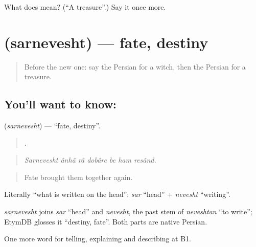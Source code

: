 \begin{tcolorbox}[breakable,colback=teal!4,colframe=teal!35!black,title={Before you move on}]
What does  mean? (\textquotedblleft{}A treasure\textquotedblright{}.) Say it once more.
\end{tcolorbox}
\section[\texorpdfstring{\fa{سرنوشت} (sarnevesht)}{سرنوشت (sarnevesht)}]{ (sarnevesht) — fate, destiny}

\label{lesson:FA-C348-sarnevesht}



\begin{quote}
Before the new one: say the Persian for a witch, then the Persian for a treasure.
\end{quote}

\subsection*{You'll want to know: }
\textbf{} (\emph{sarnevesht}) — \textquotedblleft{}fate, destiny\textquotedblright{}.

\begin{quote}
      .
\end{quote}

\begin{quote}
\emph{Sarnevesht ânhâ râ dobâre be ham resând.}
\end{quote}

\begin{quote}
Fate brought them together again.
\end{quote}

Literally \textquotedblleft{}what is written on the head\textquotedblright{}: \emph{sar} \textquotedblleft{}head\textquotedblright{} + \emph{nevesht} \textquotedblleft{}writing\textquotedblright{}.

\begin{cousinweb}
\emph{sarnevesht} joins \emph{sar} \textquotedblleft{}head\textquotedblright{} and \emph{nevesht}, the past stem of \emph{neveshtan} \textquotedblleft{}to write\textquotedblright{}; EtymDB glosses it \textquotedblleft{}destiny, fate\textquotedblright{}. Both parts are native Persian.
\end{cousinweb}

\begin{grammarlens}[title={What you've built}]
One more word for telling, explaining and describing at B1.
\end{grammarlens}

